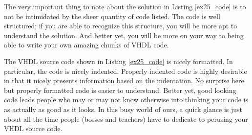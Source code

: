 \begin{my_list}
\item The very important thing to note about the solution in Listing \ref{ex25_code} is to not be intimidated by the sheer quantity of code listed. The code is well structured; if you are able to recognize this structure, you will be more apt to understand the solution. And better yet, you will be more on your way to being able to write your own amazing chunks of VHDL code. 

\item The VHDL source code shown in Listing \ref{ex25_code} is nicely formatted. In particular, the code is nicely indented. Properly indented code is highly desirable in that it nicely presents information based on the indentation. No surprise here but properly formatted code is easier to understand. Better yet, good looking code leads people who may or may not know otherwise into thinking your code is as actually as good as it looks. In this busy world of ours, a quick glance is just about all the time people (bosses and teachers) have to dedicate to perusing your VHDL source code.
\end{my_list}

